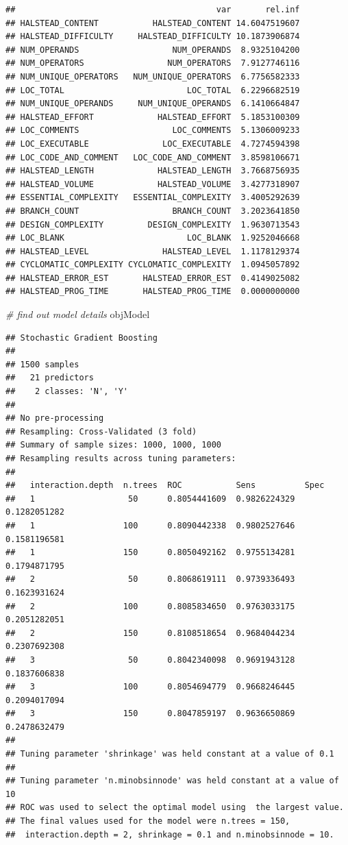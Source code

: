 \documentclass[]{book}
\newenvironment{Shaded}{\begin{snugshade}}{\end{snugshade}}
\newcommand{\CommentTok}[1]{\textcolor[rgb]{0.56,0.35,0.01}{\textit{{#1}}}}
\newcommand{\NormalTok}[1]{{#1}}
\begin{document}
\begin{verbatim}
##                                         var       rel.inf
## HALSTEAD_CONTENT           HALSTEAD_CONTENT 14.6047519607
## HALSTEAD_DIFFICULTY     HALSTEAD_DIFFICULTY 10.1873906874
## NUM_OPERANDS                   NUM_OPERANDS  8.9325104200
## NUM_OPERATORS                 NUM_OPERATORS  7.9127746116
## NUM_UNIQUE_OPERATORS   NUM_UNIQUE_OPERATORS  6.7756582333
## LOC_TOTAL                         LOC_TOTAL  6.2296682519
## NUM_UNIQUE_OPERANDS     NUM_UNIQUE_OPERANDS  6.1410664847
## HALSTEAD_EFFORT             HALSTEAD_EFFORT  5.1853100309
## LOC_COMMENTS                   LOC_COMMENTS  5.1306009233
## LOC_EXECUTABLE               LOC_EXECUTABLE  4.7274594398
## LOC_CODE_AND_COMMENT   LOC_CODE_AND_COMMENT  3.8598106671
## HALSTEAD_LENGTH             HALSTEAD_LENGTH  3.7668756935
## HALSTEAD_VOLUME             HALSTEAD_VOLUME  3.4277318907
## ESSENTIAL_COMPLEXITY   ESSENTIAL_COMPLEXITY  3.4005292639
## BRANCH_COUNT                   BRANCH_COUNT  3.2023641850
## DESIGN_COMPLEXITY         DESIGN_COMPLEXITY  1.9630713543
## LOC_BLANK                         LOC_BLANK  1.9252046668
## HALSTEAD_LEVEL               HALSTEAD_LEVEL  1.1178129374
## CYCLOMATIC_COMPLEXITY CYCLOMATIC_COMPLEXITY  1.0945057892
## HALSTEAD_ERROR_EST       HALSTEAD_ERROR_EST  0.4149025082
## HALSTEAD_PROG_TIME       HALSTEAD_PROG_TIME  0.0000000000
\end{verbatim}

\begin{Shaded}
\begin{Highlighting}[]
\CommentTok{# find out model details}
\NormalTok{objModel}
\end{Highlighting}
\end{Shaded}

\begin{verbatim}
## Stochastic Gradient Boosting 
## 
## 1500 samples
##   21 predictors
##    2 classes: 'N', 'Y' 
## 
## No pre-processing
## Resampling: Cross-Validated (3 fold) 
## Summary of sample sizes: 1000, 1000, 1000 
## Resampling results across tuning parameters:
## 
##   interaction.depth  n.trees  ROC           Sens          Spec        
##   1                   50      0.8054441609  0.9826224329  0.1282051282
##   1                  100      0.8090442338  0.9802527646  0.1581196581
##   1                  150      0.8050492162  0.9755134281  0.1794871795
##   2                   50      0.8068619111  0.9739336493  0.1623931624
##   2                  100      0.8085834650  0.9763033175  0.2051282051
##   2                  150      0.8108518654  0.9684044234  0.2307692308
##   3                   50      0.8042340098  0.9691943128  0.1837606838
##   3                  100      0.8054694779  0.9668246445  0.2094017094
##   3                  150      0.8047859197  0.9636650869  0.2478632479
## 
## Tuning parameter 'shrinkage' was held constant at a value of 0.1
## 
## Tuning parameter 'n.minobsinnode' was held constant at a value of 10
## ROC was used to select the optimal model using  the largest value.
## The final values used for the model were n.trees = 150,
##  interaction.depth = 2, shrinkage = 0.1 and n.minobsinnode = 10.
\end{verbatim}
\end{document}
